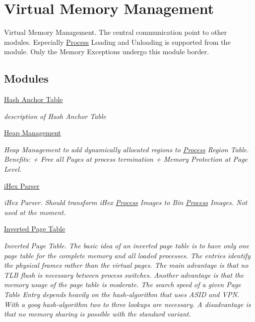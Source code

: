 \hypertarget{group___v_m_m}{
\section{Virtual Memory Management}
\label{group___v_m_m}
}
Virtual Memory Management. The central communication point to other modules. Especially \hyperlink{struct_process}{Process} Loading and Unloading is supported from the module. Only the Memory Exceptions undergo this module border.  


\subsection*{Modules}
\begin{CompactItemize}
\item 
\hyperlink{group___v_m_m___h_a_t}{Hash Anchor Table}
\begin{CompactList}\small\item\em description of Hash Anchor Table \item\end{CompactList}

\item 
\hyperlink{group___v_m_m___h_e_a_p}{Heap Management}
\begin{CompactList}\small\item\em Heap Management to add dynamically allocated regions to \hyperlink{struct_process}{Process} Region Table. Benefits: + Free all Pages at process termination + Memory Protection at Page Level. \item\end{CompactList}

\item 
\hyperlink{group___v_m_m___h_e_x}{iHex Parser}
\begin{CompactList}\small\item\em iHex Parser. Should transform iHex \hyperlink{struct_process}{Process} Images to Bin \hyperlink{struct_process}{Process} Images. Not used at the moment. \item\end{CompactList}

\item 
\hyperlink{group___v_m_m___i_p_t}{Inverted Page Table}
\begin{CompactList}\small\item\em Inverted Page Table. The basic idea of an inverted page table is to have only one page table for the complete memory and all loaded processes. The entries identify the physical frames rather than the virtual pages. The main advantage is that no TLB flush is necessary between process switches. Another advantage is that the memory usage of the page table is moderate. The search speed of a given Page Table Entry depends heavily on the hash-algorithm that uses ASID and VPN. With a goog hash-algorithm two to three lookups are necessary. A disadvantage is that no memory sharing is possible with the standard variant. \item\end{CompactList}


\end{CompactItemize}
